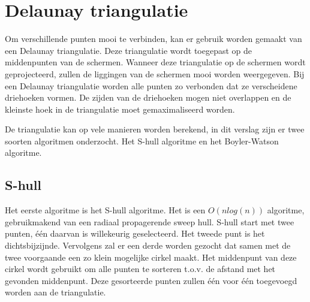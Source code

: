 \section{Delaunay triangulatie}
Om verschillende punten mooi te verbinden, kan er gebruik worden gemaakt van een Delaunay triangulatie. Deze triangulatie wordt toegepast op de middenpunten van de schermen. Wanneer deze triangulatie op de schermen wordt geprojecteerd, zullen de liggingen van de schermen mooi worden weergegeven. Bij een Delaunay triangulatie worden alle punten zo verbonden dat ze verscheidene driehoeken vormen. De zijden van de driehoeken mogen niet overlappen en de kleinste hoek in de triangulatie moet gemaximaliseerd worden. \cite{delaunaywiki}

De triangulatie kan op vele manieren worden berekend, in dit verslag zijn er twee soorten algoritmen onderzocht. Het S-hull algoritme en het Boyler-Watson algoritme.

\subsection{S-hull}
Het eerste algoritme is het S-hull algoritme. Het is een $O(nlog(n))$ algoritme, gebruikmakend van een radiaal propagerende sweep hull. S-hull start met twee punten, één daarvan is willekeurig geselecteerd. Het tweede punt is het dichtsbijzijnde. Vervolgens zal er een derde worden gezocht dat samen met de twee voorgaande een zo klein mogelijke cirkel maakt. Het middenpunt van deze cirkel wordt gebruikt om alle punten te sorteren t.o.v. de afstand met het gevonden middenpunt. Deze gesorteerde punten zullen één voor één toegevoegd worden aan de triangulatie.


